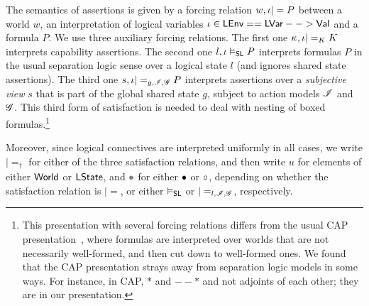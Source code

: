 The semantics of \colosl assertions is given by a forcing relation
$w,\iota|= P$ between a world $w$, an interpretation of logical
variables $\iota\in\textsf{LEnv} == \mathsf{LVar} --> \mathsf{Val}$ and a formula
$P$. We use three auxiliary forcing relations. The first one
$\kappa_{},\iota|=_K K$ interprets capability assertions. The second one
$l,\iota\mathrel{\vDash_{\mathsf{SL}}} P$ interprets formulas $P$ in the usual separation
logic sense over a logical state $l$ (and ignores shared state
assertions). The third one $s,\iota|=_{g,\mathscr{I},\mathscr{G}} P$ interprets
assertions over a \emph{subjective view} $s$ that is part of the
global shared state $g$, subject to action models $\mathscr{I}$ and
$\mathscr{G}$. This third form of satisfaction is needed to deal with
nesting of boxed formulas.\footnote{This presentation with several
  forcing relations differs from the usual CAP
  presentation~\cite{cap-ecoop10}, where formulas are interpreted over
  worlds that are not necessarily well-formed, and then cut down to
  well-formed ones. We found that the CAP presentation strays away
  from separation logic models in some ways. For instance, in CAP, $*$
  and $--*$ and not adjoints of each other; they are in our
  presentation.}

Moreover, since logical connectives are interpreted uniformly in all
cases, we write $|=_\dagger$ for either of the three satisfaction
relations, and then write $u$ for elements of either $\textsf{World}$ or
$\textsf{LState}$, and $\gray$ for either $\bullet$ or $\circ$,
depending on whether the satisfaction relation is
$|=$, or either $\mathrel{\vDash_{\mathsf{SL}}}$ or $|=_{l,\mathscr{I},\mathscr{G}}$,
respectively.

